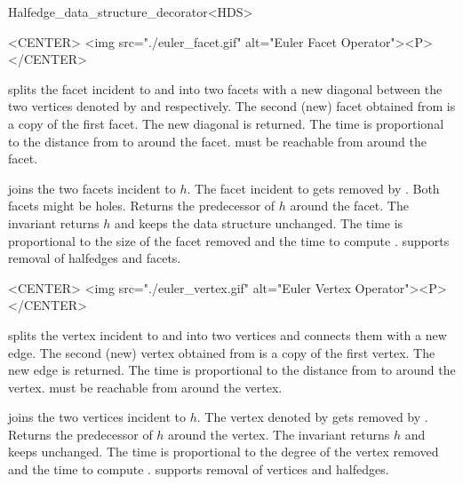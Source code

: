 \begin{ccClassTemplate}{Halfedge_data_structure_decorator<HDS>}
\begin{ccHtmlOnly}
    <CENTER>
    <img src="./euler_facet.gif" alt="Euler Facet Operator"><P>
    </CENTER>
\end{ccHtmlOnly}

    {splits the facet incident to  and  into two facets
     with a new diagonal between the two vertices denoted by  and
      respectively. The second (new) facet  obtained from
      is a copy of the first facet. The new diagonal is
     returned. The time is proportional to the distance from  
     to  around the facet.
     \ccPrecond {} must be reachable from  around the 
     facet.} 

    {joins the two facets incident to $h$. The facet incident to
       gets removed by . Both facets might be
    holes. Returns the predecessor of $h$ around the facet. The invariant
     returns $h$ and keeps
    the data structure unchanged. The time is proportional to the size
    of the facet removed and the time to compute .
    \ccPrecond {} supports removal of halfedges and facets.}


\begin{ccHtmlOnly}
    <CENTER>
    <img src="./euler_vertex.gif" alt="Euler Vertex Operator"><P>
    </CENTER>
\end{ccHtmlOnly}

    {splits the vertex incident to  and  into two vertices
     and connects them with a new edge. The second (new) vertex
     obtained from  is a copy of the first vertex. The
     new edge is returned. The time is proportional to the distance
     from  to  around the vertex.
     \ccPrecond {} must be reachable from  around the 
     vertex.} 

    {joins the two vertices incident to $h$. The vertex denoted by
      gets removed by . Returns the predecessor of
     $h$ around the vertex. The invariant 
      returns $h$
     and keeps  unchanged. 
     The time is proportional to the degree of the vertex removed and 
     the time to compute .
     \ccPrecond {} supports removal of vertices and halfedges.}


\end{ccClassTemplate}
